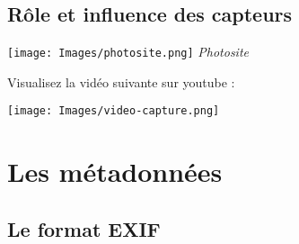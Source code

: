 \documentclass[10pt,fleqn]{article} %
\begin{document}
\subsection{Rôle et influence des capteurs}


\begin{multicols}{2}

\begin{center}
	
	\texttt{[image: Images/photosite.png]}
	\textit{Photosite}
	
\end{center}

Visualisez  la vidéo suivante sur youtube :\\

\begin{center}
	\texttt{[image: Images/video-capture.png]}
\end{center}

\end{multicols}


\section{Les métadonnées}

\subsection{Le format EXIF}
\end{document}
